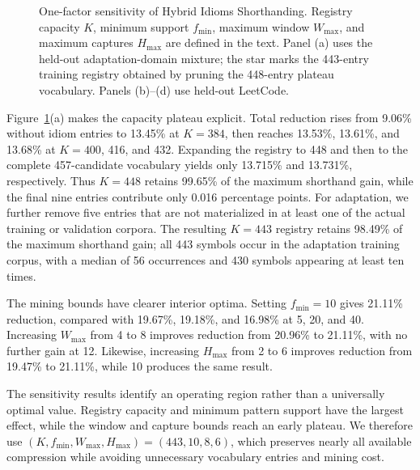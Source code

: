 \begin{figure}[!t]
  \vspace{-5pt}
  \caption{One-factor sensitivity of Hybrid Idioms Shorthanding. Registry capacity $K$, minimum support $f_{\min}$, maximum window $W_{\max}$, and maximum captures $H_{\max}$ are defined in the text. Panel (a) uses the held-out adaptation-domain mixture; the star marks the 443-entry training registry obtained by pruning the 448-entry plateau vocabulary. Panels (b)--(d) use held-out LeetCode.}
  \label{fig:parameter_sensitivity}
\end{figure}

Figure~\ref{fig:parameter_sensitivity}(a) makes the capacity plateau explicit. Total reduction rises from 9.06\% without idiom entries to 13.45\% at $K=384$, then reaches 13.53\%, 13.61\%, and 13.68\% at $K=400$, 416, and 432. Expanding the registry to 448 and then to the complete 457-candidate vocabulary yields only 13.715\% and 13.731\%, respectively. Thus $K=448$ retains 99.65\% of the maximum shorthand gain, while the final nine entries contribute only 0.016 percentage points. For adaptation, we further remove five entries that are not materialized in at least one of the actual training or validation corpora. The resulting $K=443$ registry retains 98.49\% of the maximum shorthand gain; all 443 symbols occur in the adaptation training corpus, with a median of 56 occurrences and 430 symbols appearing at least ten times.

The mining bounds have clearer interior optima. Setting $f_{\min}=10$ gives 21.11\% reduction, compared with 19.67\%, 19.18\%, and 16.98\% at 5, 20, and 40. Increasing $W_{\max}$ from 4 to 8 improves reduction from 20.96\% to 21.11\%, with no further gain at 12. Likewise, increasing $H_{\max}$ from 2 to 6 improves reduction from 19.47\% to 21.11\%, while 10 produces the same result.

The sensitivity results identify an operating region rather than a universally optimal value. Registry capacity and minimum pattern support have the largest effect, while the window and capture bounds reach an early plateau. We therefore use $(K,f_{\min},W_{\max},H_{\max})=(443,10,8,6)$, which preserves nearly all available compression while avoiding unnecessary vocabulary entries and mining cost.

